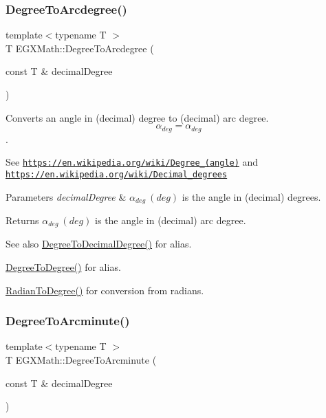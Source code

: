 \subsubsection{\texorpdfstring{Degree\+To\+Arcdegree()}{DegreeToArcdegree()}}
{\footnotesize\ttfamily template$<$typename T $>$ \\
T E\+G\+X\+Math\+::\+Degree\+To\+Arcdegree (\begin{DoxyParamCaption}\item[{const T \&}]{decimal\+Degree }\end{DoxyParamCaption})}



Converts an angle in (decimal) degree to (decimal) arc degree. \[\alpha_{deg}=\alpha_{deg}\]. 

See \href{https://en.wikipedia.org/wiki/Degree_(angle)}{\tt https\+://en.\+wikipedia.\+org/wiki/\+Degree\+\_\+(angle)} and \href{https://en.wikipedia.org/wiki/Decimal_degrees}{\tt https\+://en.\+wikipedia.\+org/wiki/\+Decimal\+\_\+degrees} 
\begin{DoxyParams}{Parameters}
{\em decimal\+Degree} & $\alpha_{deg}\ (deg)$ is the angle in (decimal) degrees. \\
\hline
\end{DoxyParams}
\begin{DoxyReturn}{Returns}
$\alpha_{deg}\ (deg)$ is the angle in (decimal) arc degree. 
\end{DoxyReturn}
\begin{DoxySeeAlso}{See also}
\mbox{\hyperlink{group___e_g_x_math-_angle_conversions-_degree_ga568afc1d436d425bf5d4edea584aee08}{Degree\+To\+Decimal\+Degree()}} for alias. 

\mbox{\hyperlink{group___e_g_x_math-_angle_conversions-_degree_gaca157e7d3e99a46a11a04b92680d2574}{Degree\+To\+Degree()}} for alias. 

\mbox{\hyperlink{group___e_g_x_math-_angle_conversions-_radian_ga25bbce6cdc1c3621f2a158d320e3bc45}{Radian\+To\+Degree()}} for conversion from radians. 
\end{DoxySeeAlso}
\mbox{\label{group___e_g_x_math-_angle_conversions-_degree_ga8abf327dc5f52907b2c881999e9cc43e}} 
\subsubsection{\texorpdfstring{Degree\+To\+Arcminute()}{DegreeToArcminute()}}
{\footnotesize\ttfamily template$<$typename T $>$ \\
T E\+G\+X\+Math\+::\+Degree\+To\+Arcminute (\begin{DoxyParamCaption}\item[{const T \&}]{decimal\+Degree }\end{DoxyParamCaption})}



